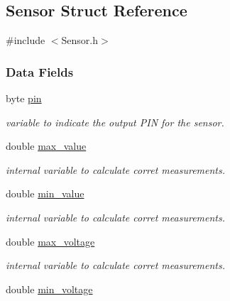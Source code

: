 \hypertarget{struct_sensor}{\subsection{Sensor Struct Reference}
\label{struct_sensor}
}


{\ttfamily \#include $<$Sensor.\+h$>$}

\subsubsection*{Data Fields}
\begin{DoxyCompactItemize}
\item 
\hypertarget{struct_sensor_ab17e87ffa7bbb8cac12a4ec11a52b5e2}{byte \hyperlink{struct_sensor_ab17e87ffa7bbb8cac12a4ec11a52b5e2}{pin}}\label{struct_sensor_ab17e87ffa7bbb8cac12a4ec11a52b5e2}

\begin{DoxyCompactList}\small\item\em variable to indicate the output P\+I\+N for the sensor. \end{DoxyCompactList}\item 
\hypertarget{struct_sensor_a7077a0bfc0aa4fa5a4f40bd7bf5eaee0}{double \hyperlink{struct_sensor_a7077a0bfc0aa4fa5a4f40bd7bf5eaee0}{max\+\_\+value}}\label{struct_sensor_a7077a0bfc0aa4fa5a4f40bd7bf5eaee0}

\begin{DoxyCompactList}\small\item\em internal variable to calculate corret measurements. \end{DoxyCompactList}\item 
\hypertarget{struct_sensor_ac1a2ce47c792f87353ccd89465413de5}{double \hyperlink{struct_sensor_ac1a2ce47c792f87353ccd89465413de5}{min\+\_\+value}}\label{struct_sensor_ac1a2ce47c792f87353ccd89465413de5}

\begin{DoxyCompactList}\small\item\em internal variable to calculate corret measurements. \end{DoxyCompactList}\item 
\hypertarget{struct_sensor_aa13bbc67e23866bcb9a2a19a9e741087}{double \hyperlink{struct_sensor_aa13bbc67e23866bcb9a2a19a9e741087}{max\+\_\+voltage}}\label{struct_sensor_aa13bbc67e23866bcb9a2a19a9e741087}

\begin{DoxyCompactList}\small\item\em internal variable to calculate corret measurements. \end{DoxyCompactList}\item 
\hypertarget{struct_sensor_a4df2ed1d0372c2b0b2227f3d2be14c84}{double \hyperlink{struct_sensor_a4df2ed1d0372c2b0b2227f3d2be14c84}{min\+\_\+voltage}}\label{struct_sensor_a4df2ed1d0372c2b0b2227f3d2be14c84}


\end{DoxyCompactItemize}
